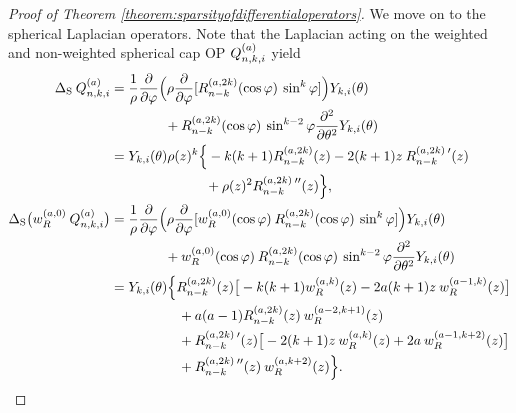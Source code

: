 \documentclass[11pt, oneside]{article}   	%
\begin{document}
\begin{proof}[Proof of Theorem \ref{theorem:sparsityofdifferentialoperators}]
We move on to the spherical Laplacian operators. Note that the Laplacian acting on the weighted and non-weighted spherical cap OP $Q_{n,k,i}^{(a)}$ yield
\begin{align}
	\Delta_{\rm S} \: Q_{n,k,i}^{(a)} &= {1 \over \rho} {\partial \over \partial \varphi} \Big( \rho {\partial \over \partial \varphi} [R_{n-k}^{(a,2k)}(\cos\varphi) \: \sin^k\varphi] \Big) Y_{k,i}(\theta) \nonumber \\
	&\quad \quad \quad \quad + R_{n-k}^{(a,2k)}(\cos\varphi) \: \sin^{k-2}\varphi {\partial^{2} \over \partial {\theta}^{2}} Y_{k,i}(\theta) \nonumber \\
	&= Y_{k,i}(\theta) \rho(z)^k \Big\{ -k(k+1) R_{n-k}^{(a,2k)}(z) - 2(k+1) z \: R_{n-k}^{(a,2k) \: \prime}(z) \nonumber \\
	&\quad \quad \quad \quad \quad \quad \quad + \rho(z)^2 R_{n-k}^{(a,2k) \: \prime \prime}(z) \Big\}, \label{eqn:oplaplacian} \\
	\Delta_{\rm S} \big(w_R^{(a,0)} \: Q_{n,k,i}^{(a)} \big) &= {1 \over \rho} {\partial \over \partial \varphi} \Big( \rho {\partial \over \partial \varphi} [w_R^{(a,0)}(\cos\varphi) \: R_{n-k}^{(a,2k)}(\cos\varphi) \: \sin^k\varphi] \Big) Y_{k,i}(\theta) \nonumber \\
	&\quad \quad \quad \quad + w_R^{(a,0)}(\cos\varphi) \: R_{n-k}^{(a,2k)}(\cos\varphi) \: \sin^{k-2}\varphi {\partial^{2} \over \partial {\theta}^{2}} Y_{k,i}(\theta) \nonumber \\
	&= Y_{k,i}(\theta) \Big\{R_{n-k}^{(a,2k)}(z) \big[ -k(k+1) w_R^{(a,k)}(z) - 2a(k+1) z \: w_R^{(a-1,k)}(z) \big] \nonumber \\
	&\quad \quad \quad \quad \quad + a(a-1) R_{n-k}^{(a,2k)}(z) \: w_R^{(a-2,k+1)}(z) \nonumber \\
	&\quad \quad \quad \quad \quad + R_{n-k}^{(a,2k) \: \prime}(z) \big[ -2(k+1) z \: w_R^{(a,k)}(z) + 2a \: w_R^{(a-1,k+2)}(z) \big] \nonumber \\
	&\quad \quad \quad \quad \quad + R_{n-k}^{(a,2k) \: \prime \prime}(z) \: w_R^{(a,k+2)}(z) \Big\}. \label{eqn:woplaplacian}
\end{align}


\end{proof}
\end{document}
